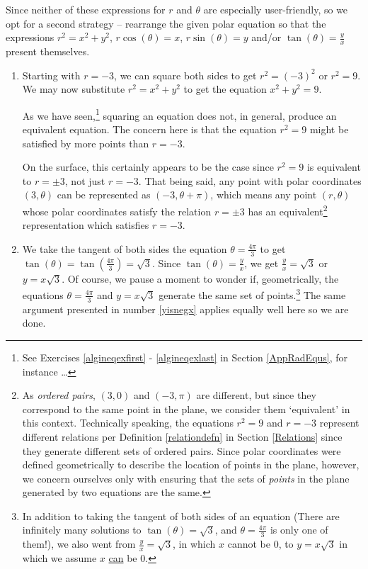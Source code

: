 \documentclass{ximera}
\begin{document}
\begin{example}
\begin{explanation}
\begin{enumerate}
 

Since neither of these expressions for $r$ and $\theta$ are especially user-friendly, so we opt for a second strategy -- rearrange the given polar equation so that the expressions $r^2 = x^2+y^2$, $r\cos(\theta)=x$,  $r\sin(\theta)=y$ and/or $\tan(\theta) = \frac{y}{x}$ present themselves.

\begin{enumerate}

\item Starting with $r = -3$, we can square both sides to get  $r^2 = (-3)^2$ or $r^2 = 9$.  We may now substitute $r^2 = x^2+y^2$ to get the equation $x^2+y^2 = 9$.  

 

As we have seen,\footnote{See Exercises \ref{algineqexfirst} - \ref{algineqexlast} in Section \ref{AppRadEqus}, for instance \ldots} squaring an equation does not, in general, produce an equivalent equation.  The concern here is that the equation $r^2 = 9$ might be satisfied by more points than  $r = -3$.  

 

On the surface, this certainly appears to be the case since $r^2 = 9$ is equivalent to $r = \pm 3$, not just $r=-3$.  That being said,  any point with polar coordinates $(3,\theta)$ can be represented as $(-3,\theta + \pi)$, which means any point $(r,\theta)$ whose polar coordinates satisfy the relation $r = \pm 3$ has an equivalent\footnote{As \textit{ordered pairs}, $(3,0)$ and $(-3,\pi)$ are different, but since they correspond to the same point in the plane, we consider them `equivalent'  in this context. Technically speaking,  the equations $r^2 = 9$ and $r=-3$ represent different relations per Definition \ref{relationdefn} in Section \ref{Relations} since they generate different sets of ordered pairs.  Since polar coordinates were defined geometrically to describe the location of points in the plane, however, we concern ourselves only with ensuring that the sets of \textit{points} in the plane generated by two equations are the same.  } representation which satisfies $r=-3$.

\item  We take the tangent of both sides the equation $\theta = \frac{4\pi}{3}$ to get $\tan(\theta) = \tan\left(\frac{4\pi}{3}\right) = \sqrt{3}$.  Since $\tan(\theta) = \frac{y}{x}$, we get $\frac{y}{x} = \sqrt{3}$ or $y = x\sqrt{3}$.  Of course, we pause a moment to wonder if, geometrically, the equations $\theta = \frac{4\pi}{3}$ and $y = x\sqrt{3}$ generate the same set of points.\footnote{In addition to taking the tangent of both sides of an equation (There are infinitely many solutions to $\tan(\theta) = \sqrt{3}$, and $\theta = \frac{4\pi}{3}$ is only one of them!), we also went from $\frac{y}{x} = \sqrt{3}$, in which $x$ cannot be $0$, to $y = x\sqrt{3}$ in which we assume $x$ \underline{can} be $0$.}  The same argument presented in number \ref{yisnegx} applies equally well here so we are done.


\end{enumerate}
\end{enumerate}
\end{explanation}
\end{example}
\end{document}
